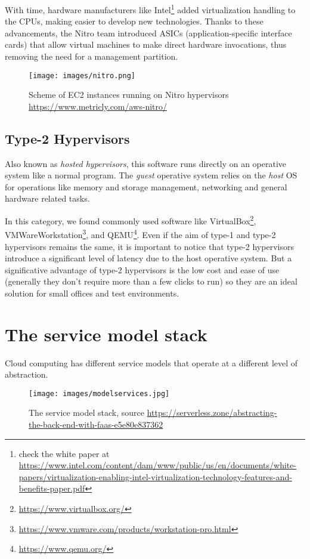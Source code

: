 With time, hardware manufacturers like Intel\footnote{check the white
  paper at \url{
    https://www.intel.com/content/dam/www/public/us/en/documents/white-papers/virtualization-enabling-intel-virtualization-technology-features-and-benefits-paper.pdf}}
added virtualization handling to the CPUs, making easier to develop
new technologies.  Thanks to these advancements, the Nitro team
introduced ASICs (application-specific interface cards) that allow
virtual machines to make direct hardware invocations, thus removing
the need for a management partition.
\begin{figure}[h]
  \centering
  \texttt{[image: images/nitro.png]}
  \caption{Scheme of EC2 instances running on Nitro hypervisors
    \url{https://www.metricly.com/aws-nitro/}}
  \label{fig:nitro}
\end{figure}

\subsection{Type-2 Hypervisors}
\label{sub:type2hypervisor}
Also known as \textit{hosted  hypervisors}, this software runs directly on an operative system like a normal program.
The \textit{guest} operative system relies on the \textit{host} OS for operations like memory and storage management,
networking and general hardware related tasks.

In this category, we found commonly used software like
VirtualBox\footnote{\url{https://www.virtualbox.org/}},
VMWareWorkstation\footnote{\url{https://www.vmware.com/products/workstation-pro.html}},
and QEMU\footnote{\url{https://www.qemu.org/}}.  Even if the aim of
type-1 and type-2 hypervisors remains the same, it is important to
notice that type-2 hypervisors introduce a significant level of
latency due to the host operative system.  But a significative
advantage of type-2 hypervisors is the low cost and ease of use
(generally they don't require more than a few clicks to run) so they
are an ideal solution for small offices and test environments.


\section{The service model stack}
\label{sec:modelstack}
Cloud computing has different service models that operate at a
different level of abstraction.
\begin{figure}[h]
  \centering
  \texttt{[image: images/modelservices.jpg]}
  \caption{ The service model stack, source 
  \url{https://serverless.zone/abstracting-the-back-end-with-faas-e5e80e837362}}
    \label{fig:modelservices}
\end{figure}

